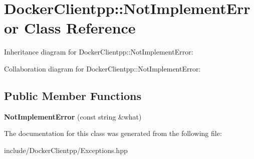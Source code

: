 \hypertarget{classDockerClientpp_1_1NotImplementError}{}\section{Docker\+Clientpp\+::Not\+Implement\+Error Class Reference}
\label{classDockerClientpp_1_1NotImplementError}


Inheritance diagram for Docker\+Clientpp\+::Not\+Implement\+Error\+:


Collaboration diagram for Docker\+Clientpp\+::Not\+Implement\+Error\+:
\subsection*{Public Member Functions}
\begin{DoxyCompactItemize}
\item 
\mbox{\label{classDockerClientpp_1_1NotImplementError_acf7636fe4330f6bab25e5f883859b5fa}} 
{\bfseries Not\+Implement\+Error} (const string \&what)
\end{DoxyCompactItemize}


The documentation for this class was generated from the following file\+:\begin{DoxyCompactItemize}
\item 
include/\+Docker\+Clientpp/Exceptions.\+hpp\end{DoxyCompactItemize}
